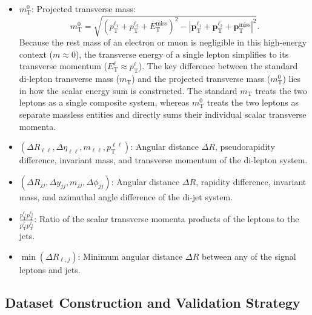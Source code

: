 \documentclass[12pt]{article}
\renewcommand{\vec}[1]{\boldsymbol{\mathbf{#1}}}
\begin{document}
\begin{itemize}
            \item $m_{\text{T}}^{0}$: Projected transverse mass:
                \begin{equation}
                    m_{\text{T}}^{0} = \sqrt{\left( p_{\text{T}}^{\ell_1} + p_{\text{T}}^{\ell_2} + E_{\text{T}}^{\text{miss} } \right)^2 - \left| \vec{p}_{\text{T}}^{\ell_1} + \vec{p}_{\text{T}}^{\ell_2} + \vec{p}_{\text{T}}^{\text{miss}} \right|^2}.
                \end{equation}
                Because the rest mass of an electron or muon is negligible in this high-energy context ($m \approx 0$), the transverse energy of a single lepton simplifies to its transverse momentum ($E_{\text{T}}^{\ell} \approx p_{\text{T}}^{\ell}$). The key difference between the standard di-lepton transverse mass ($m_{\text{T}}$) and the projected transverse mass ($m_{\text{T}}^{0}$) lies in how the scalar energy sum is constructed. The standard $m_{\text{T}}$ treats the two leptons as a single composite system, whereas $m_{\text{T}}^{0}$ treats the two leptons as separate massless entities and directly sums their individual scalar transverse momenta.

            \item $(\Delta R_{\ell\ell}, \Delta\eta_{\ell\ell}, m_{\ell\ell}, p_{\text{T}}^{\ell\ell})$: Angular distance $\Delta R$, pseudorapidity difference, invariant mass, and transverse momentum of the di-lepton system.

            \item $(\Delta R_{jj}, \Delta y_{jj}, m_{jj}, \Delta\phi_{jj})$: Angular distance $\Delta R$, rapidity difference, invariant mass, and azimuthal angle difference of the di-jet system.

            \item $\displaystyle \frac{p_{\text{T}}^{\ell_1} p_{\text{T}}^{\ell_2}}{p_{\text{T}}^{j_1} p_{\text{T}}^{j_2}}$: Ratio of the scalar transverse momenta products of the leptons to the jets.

            \item $\min(\Delta R_{\ell, j})$: Minimum angular distance $\Delta R$ between any of the signal leptons and jets.
        \end{itemize}


    \subsection{Dataset Construction and Validation Strategy}%
    \label{sub:datasets_construction}
\end{document}
